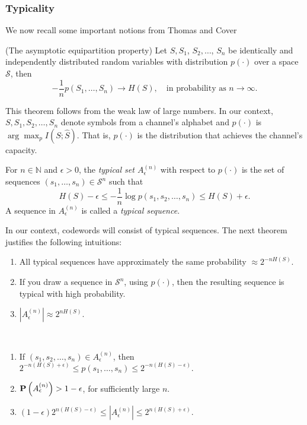 \subsubsection*{Typicality}

We now recall some important notions from Thomas and Cover~\cite{infotheory}

\begin{theorem}{(The asymptotic equipartition property)} Let $S, S_1$, $S_2, \ldots$, $S_n$ be identically and independently distributed random variables with distribution $p(\cdot)$ over a space $\mathcal{S}$, then
%
$$-\frac{1}{n} p(S_1, \ldots, S_n) \to H(S), \quad \text{in probability as } n \to \infty.$$
%
\end{theorem}

This theorem follows from the weak law of large numbers. In our context, $S, S_1, S_2, \ldots, S_n$ denote symbols from a channel's alphabet and $p(\cdot)$ is $\arg\max_p I(S; \hat{S})$. That is, $p(\cdot)$ is the distribution that achieves the channel's capacity.

\begin{definition}
For $n \in \mathbb{N}$ and $\epsilon > 0$, the \emph{typical set $A^{(n)}_\epsilon$} with respect to $p(\cdot)$ is the set of sequences $(s_1, \dots, s_n) \in \mathcal{S}^n$ such that
%
$$H(S) - \epsilon \leq -\frac{1}{n}\log p(s_1, s_2, \ldots, s_n) \leq H(S) + \epsilon.$$
%
A sequence in $A^{(n)}_\epsilon$ is called a \emph{typical sequence}.
\end{definition}

In our context, codewords will consist of typical sequences.
The next theorem justifies the following intuitions:

\begin{enumerate}
\item All typical sequences have approximately the same probability $\approx 2^{-nH(S)}$.
\item If you draw a sequence in $\mathcal{S}^n$, using $p(\cdot)$, then the resulting sequence is typical with high probability.
\item $\left|A^{(n)}_\epsilon\right| \approx 2^{nH(S)}$.
\end{enumerate}

\begin{theorem}\mbox{   }
\begin{enumerate}
\item If $\left(s_1, s_2, \ldots, s_n\right) \in A^{(n)}_\epsilon$, then $2^{-n\left(H(S) + \epsilon\right)} \leq p(s_1, \ldots, s_n) \leq 2^{-n\left(H(S) - \epsilon\right)}.$
\item $\mathbf{P}\left(A^{(n)}_\epsilon\right) > 1 - \epsilon$, for sufficiently large $n$.
\item $(1 - \epsilon)2^{n\left(H(S) - \epsilon\right)} \leq \left|A^{(n)}_\epsilon\right| \leq 2^{n\left(H(S) + \epsilon\right)}$.
\end{enumerate}
\end{theorem}

